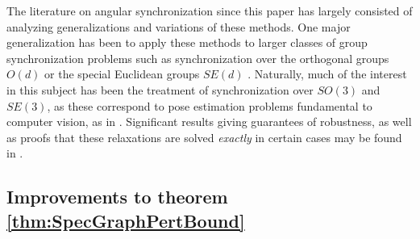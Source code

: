 The literature on angular synchronization since this paper has largely consisted of analyzing generalizations and variations of these methods.  One major generalization has been to apply these methods to larger classes of group synchronization problems such as synchronization over the orthogonal groups $O(d)$ or the special Euclidean groups $SE(d)$ \cite{Cheeger,briales2017cartan_sync,bandeira2016se_sync}.  Naturally, much of the interest in this subject has been the treatment of synchronization over $SO(3)$ and $SE(3)$, as these correspond to pose estimation problems fundamental to computer vision, as in \cite{enqvist2011nonsequential, olsson2017rot_avg, fischler1981ransac, govindu2006motion_avg}.  Significant results giving guarantees of robustness, as well as proofs that these relaxations are solved \emph{exactly} in certain cases may be found in \cite{alexeev2014phase, bandeira2016tightness, olsson2017rot_avg, bandeira2016se_sync}.

\subsection{Improvements to theorem \ref{thm:SpecGraphPertBound}}

